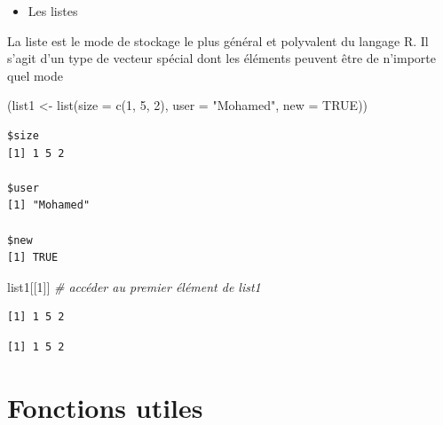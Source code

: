 \documentclass[
  8pt,
  ignorenonframetext,
]{beamer}
\newenvironment{Shaded}{\begin{snugshade}}{\end{snugshade}}
\newcommand{\AttributeTok}[1]{\textcolor[rgb]{0.77,0.63,0.00}{#1}}
\newcommand{\CommentTok}[1]{\textcolor[rgb]{0.56,0.35,0.01}{\textit{#1}}}
\newcommand{\ConstantTok}[1]{\textcolor[rgb]{0.00,0.00,0.00}{#1}}
\newcommand{\DecValTok}[1]{\textcolor[rgb]{0.00,0.00,0.81}{#1}}
\newcommand{\FunctionTok}[1]{\textcolor[rgb]{0.00,0.00,0.00}{#1}}
\newcommand{\NormalTok}[1]{#1}
\newcommand{\OtherTok}[1]{\textcolor[rgb]{0.56,0.35,0.01}{#1}}
\newcommand{\StringTok}[1]{\textcolor[rgb]{0.31,0.60,0.02}{#1}}
\providecommand{\tightlist}{%
  \setlength{\itemsep}{0pt}\setlength{\parskip}{0pt}}
\begin{document}
\begin{frame}[fragile]{}
\protect\hypertarget{section-5}{}
\begin{itemize}
\tightlist
\item
  Les listes
\end{itemize}

La liste est le mode de stockage le plus général et polyvalent du
langage R. Il s'agit d'un type de vecteur spécial dont les éléments
peuvent être de n'importe quel mode

\begin{Shaded}
\begin{Highlighting}[]
\NormalTok{(list1 }\OtherTok{\textless{}{-}} \FunctionTok{list}\NormalTok{(}\AttributeTok{size =} \FunctionTok{c}\NormalTok{(}\DecValTok{1}\NormalTok{, }\DecValTok{5}\NormalTok{, }\DecValTok{2}\NormalTok{), }\AttributeTok{user =} \StringTok{"Mohamed"}\NormalTok{, }\AttributeTok{new =} \ConstantTok{TRUE}\NormalTok{))}
\end{Highlighting}
\end{Shaded}

\begin{verbatim}
$size
[1] 1 5 2

$user
[1] "Mohamed"

$new
[1] TRUE
\end{verbatim}

\begin{Shaded}
\begin{Highlighting}[]
\NormalTok{list1[[}\DecValTok{1}\NormalTok{]]   }\CommentTok{\# accéder au premier élément de list1}
\end{Highlighting}
\end{Shaded}

\begin{verbatim}
[1] 1 5 2
\end{verbatim}

\begin{Shaded}
\end{Shaded}

\begin{verbatim}
[1] 1 5 2
\end{verbatim}
\end{frame}

\hypertarget{fonctions-utiles}{%
\section{Fonctions utiles}\label{fonctions-utiles}}
\end{document}
